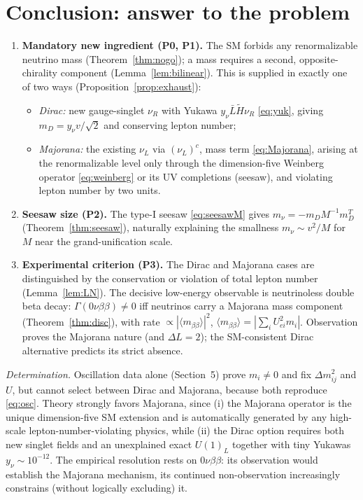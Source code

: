 \documentclass[12pt]{article}
\theoremstyle{definition}
\newcommand{\nuL}{\nu_L}
\newcommand{\nuR}{\nu_R}
\begin{document}
\section{Conclusion: answer to the problem}

\begin{enumerate}
\item \textbf{Mandatory new ingredient (P0, P1).} The SM forbids any
renormalizable neutrino mass (Theorem~\ref{thm:nogo}); a mass requires a
second, opposite-chirality component (Lemma~\ref{lem:bilinear}). This is
supplied in exactly one of two ways
(Proposition~\ref{prop:exhaust}):
\begin{itemize}
\item \emph{Dirac:} new gauge-singlet $\nuR$ with Yukawa
$y_\nu\bar L\widetilde H\nuR$ \eqref{eq:yuk}, giving
$m_D=y_\nu v/\sqrt2$ and conserving lepton number;
\item \emph{Majorana:} the existing $\nuL$ via $(\nuL)^c$, mass term
\eqref{eq:Majorana}, arising at the renormalizable level only through the
dimension-five Weinberg operator \eqref{eq:weinberg} or its UV
completions (seesaw), and violating lepton number by two units.
\end{itemize}
\item \textbf{Seesaw size (P2).} The type-I seesaw \eqref{eq:seesawM}
gives $m_\nu=-m_DM^{-1}m_D^T$ (Theorem~\ref{thm:seesaw}), naturally
explaining the smallness $m_\nu\sim v^2/M$ for $M$ near the
grand-unification scale.
\item \textbf{Experimental criterion (P3).} The Dirac and Majorana cases
are distinguished by the conservation or violation of total lepton number
(Lemma~\ref{lem:LN}). The decisive low-energy observable is neutrinoless
double beta decay: $\Gamma(0\nu\beta\beta)\neq0$ iff neutrinos carry a
Majorana mass component (Theorem~\ref{thm:disc}), with rate
$\propto|\langle m_{\beta\beta}\rangle|^2$,
$\langle m_{\beta\beta}\rangle=|\sum_iU_{ei}^2m_i|$. Observation proves
the Majorana nature (and $\Delta L=2$); the SM-consistent Dirac
alternative predicts its strict absence.
\end{enumerate}

\noindent\emph{Determination.} Oscillation data alone (Section~5) prove
$m_i\neq0$ and fix $\Delta m^2_{ij}$ and $U$, but cannot select between
Dirac and Majorana, because both reproduce \eqref{eq:osc}. Theory
strongly favors Majorana, since (i) the Majorana operator is the unique
dimension-five SM extension and is automatically generated by any
high-scale lepton-number-violating physics, while (ii) the Dirac option
requires both new singlet fields and an unexplained exact $U(1)_L$
together with tiny Yukawas $y_\nu\sim10^{-12}$. The empirical resolution
rests on $0\nu\beta\beta$: its observation would establish the Majorana
mechanism, its continued non-observation increasingly constrains (without
logically excluding) it.
\end{document}
